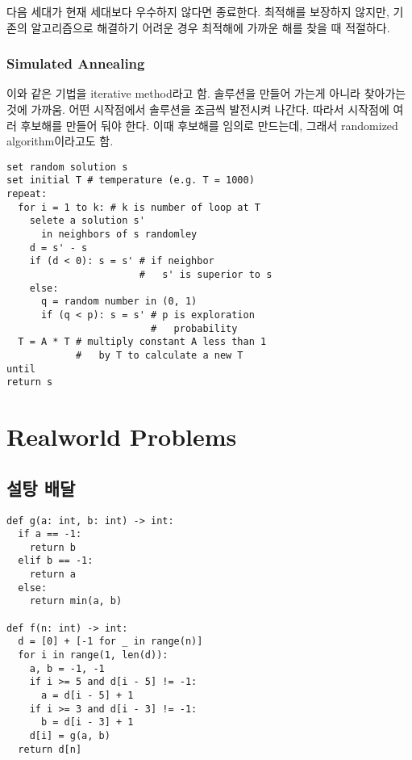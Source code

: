 다음 세대가 현재 세대보다 우수하지 않다면 종료한다. 최적해를 보장하지 않지만, 기존의 알고리즘으로 해결하기 어려운 경우 최적해에 가까운 해를 찾을 때 적절하다.

\subsubsection{Simulated Annealing}

이와 같은 기법을 iterative method라고 함. 솔루션을 만들어 가는게 아니라 찾아가는 것에 가까움. 어떤 시작점에서 솔루션을 조금씩 발전시켜 나간다. 따라서 시작점에 여러 후보해를 만들어 둬야 한다. 이때 후보해를 임의로 만드는데, 그래서 randomized algorithm이라고도 함.

\begin{verbatim}
set random solution s
set initial T # temperature (e.g. T = 1000)
repeat:
  for i = 1 to k: # k is number of loop at T
    selete a solution s'
      in neighbors of s randomley
    d = s' - s
    if (d < 0): s = s' # if neighbor
                       #   s' is superior to s
    else:
      q = random number in (0, 1)
      if (q < p): s = s' # p is exploration
                         #   probability
  T = A * T # multiply constant A less than 1
            #   by T to calculate a new T
until
return s
\end{verbatim}

\section{Realworld Problems}

\subsection{설탕 배달}

\begin{verbatim}
def g(a: int, b: int) -> int:
  if a == -1:
    return b
  elif b == -1:
    return a
  else:
    return min(a, b)

def f(n: int) -> int:
  d = [0] + [-1 for _ in range(n)]
  for i in range(1, len(d)):
    a, b = -1, -1
    if i >= 5 and d[i - 5] != -1:
      a = d[i - 5] + 1
    if i >= 3 and d[i - 3] != -1:
      b = d[i - 3] + 1
    d[i] = g(a, b)
  return d[n]
\end{verbatim}

